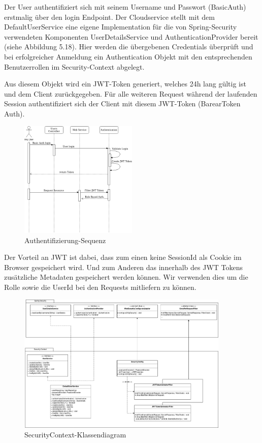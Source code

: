 Der User authentifiziert sich mit seinem Username und Passwort (BasicAuth) erstmalig über den login Endpoint.
Der Cloudservice stellt mit dem DefaultUserService eine eigene Implementation für die von Spring-Security verwendeten Komponenten UserDetailsService und AuthenticationProvider bereit (siehe Abbildung 5.18).
Hier werden die übergebenen Credentials überprüft und bei erfolgreicher Anmeldung ein Authentication Objekt mit den entsprechenden Benutzerrollen im Security-Context abgelegt.\cite{basicAuth}

Aus diesem Objekt wird ein JWT-Token generiert, welches 24h lang gültig ist und dem Client zurückgegeben.
Für alle weiteren Request während der laufenden Session authentifiziert sich der Client mit diesem JWT-Token (BarearToken Auth).

\begin{figure}[h]
    \centering
    \includegraphics[width=0.5\textwidth]{graphics/Authentication-export}\caption[Authentifizierung-Sequenz]{Authentifizierung-Sequenz}
\end{figure}

Der Vorteil an JWT ist dabei, dass zum einen keine SessionId als Cookie im Browser gespeichert wird.\cite{tokenVsSessionId}
Und zum Anderen das innerhalb des JWT Tokens zusätzliche Metadaten gespeichert werden können.\cite{jwtIntro}
Wir verwenden dies um die Rolle sowie die UserId bei den Requests mitliefern zu können.

\clearpage
\begin{figure}[h]
    \centering
    \includegraphics[width=0.9\textwidth]{graphics/SecuirtyContextClassDiagram-export}\caption[SecurityContext-Klassendiagram]{SecurityContext-Klassendiagram}
\end{figure}\label{fig:securityclassdiagram}

